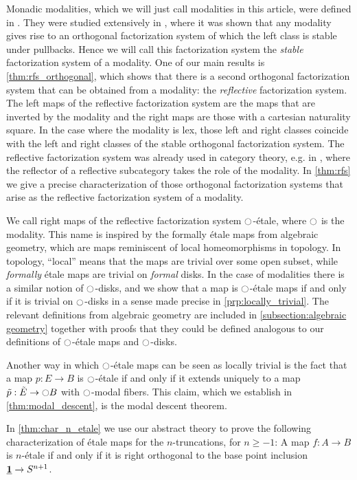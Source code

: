 \documentclass[9pt,twosided]{amsart}
\begin{document}
Monadic modalities, which we will just call modalities in this article, were defined in \cite[Section 7.7]{UFP}. They were studied extensively in \cite{RijkeSpittersShulman}, where it was shown that any modality gives rise to an orthogonal factorization system of which the left class is stable under pullbacks. Hence we will call this factorization system the \emph{stable} factorization system of a modality. One of our main results is \cref{thm:rfs_orthogonal}, which shows that there is a second orthogonal factorization system that can be obtained from a modality: the \emph{reflective} factorization system. The left maps of the reflective factorization system are the maps that are inverted by the modality and the right maps are those with a cartesian naturality square. In the case where the modality is lex, those left and right classes coincide with the left and right classes of the stable orthogonal factorization system. The reflective factorization system was already used in category theory, e.g. in \cite{cassidy_hebert_kelly_1985},
where the reflector of a reflective subcategory takes the role of the modality. In \cref{thm:rfs} we give a precise characterization of those orthogonal factorization systems that arise as the reflective factorization system of a modality.

We call right maps of the reflective factorization system ${\ocircle}$-étale, where ${\ocircle}$ is the modality.
This name is inspired by the formally étale maps from algebraic geometry,
which are maps reminiscent of local homeomorphisms in topology.
In topology, ``local'' means that the maps are trivial over some open subset, while \emph{formally} étale maps are trivial on \emph{formal} disks.
In the case of modalities there is a similar notion of ${\ocircle}$-disks, and we show that a map is ${\ocircle}$-étale maps if and only if it is trivial on ${\ocircle}$-disks in a sense made precise in \cref{prp:locally_trivial}.
The relevant definitions from algebraic geometry are included in \cref{subsection:algebraic geometry}
together with proofs that they could be defined analogous to our definitions of ${\ocircle}$-étale maps and ${\ocircle}$-disks.

Another way in which ${\ocircle}$-\'etale maps can be seen as locally trivial is the fact that a map $p:E\to B$ is ${\ocircle}$-\'etale if and only if it extends uniquely to a map $\tilde{p}:\tilde{E}\to {\ensuremath{\ocircle}} B$ with ${\ocircle}$-modal fibers. This claim, which we establish in \cref{thm:modal_descent}, is the modal descent theorem. 

In \cref{thm:char_n_etale} we use our abstract theory to prove the following characterization of étale maps for the $n$-truncations, for $n\geq -1$:
A map $f:A\to B$ is $n$-\'etale if and only if it is right orthogonal to the base point inclusion $\underline{\mathbf{1}}\to S^{n+1}$.
\end{document}
